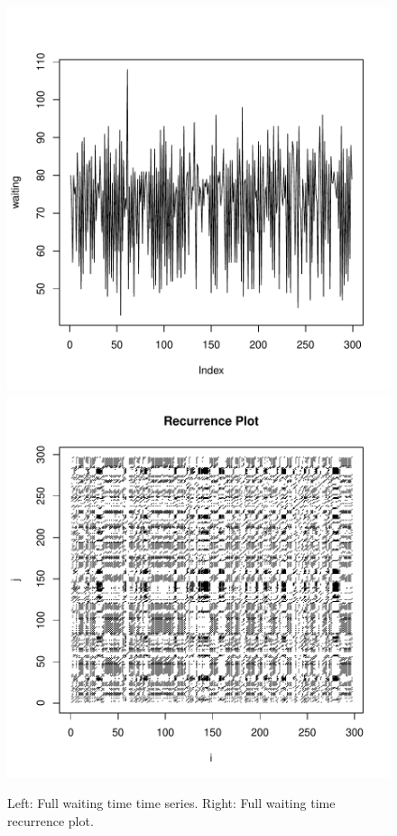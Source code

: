 \documentclass[english,final]{scrartcl}
\begin{document}
\begin{figure}[htbp]
\centering
\includegraphics{Geyser-Analysis-plot_wait_period2}
\hspace{1cm}
\includegraphics{Geyser-Analysis-rec_waiting_plot2}
\caption{Left: Full waiting time time series. Right: Full waiting time recurrence plot.}
\label{fig:ts2}
\end{figure}
\end{document}
